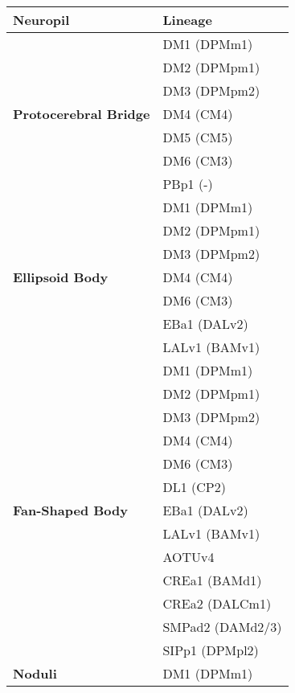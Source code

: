         \begin{table}[ht]
        \centering
        \begin{tabular}{l|l}
            \toprule
            \textbf{Neuropil} & \textbf{Lineage} \\
            \midrule
            \multirow{7}{*}{\textbf{Protocerebral Bridge}} 
                & DM1 (DPMm1) \\
                & DM2 (DPMpm1) \\
                & DM3 (DPMpm2) \\
                & DM4 (CM4) \\
                & DM5 (CM5) \\
                & DM6 (CM3) \\
                & PBp1 (-) \\
            \midrule
            \multirow{7}{*}{\textbf{Ellipsoid Body}} 
                & DM1 (DPMm1) \\
                & DM2 (DPMpm1) \\
                & DM3 (DPMpm2) \\
                & DM4 (CM4) \\
                & DM6 (CM3) \\
                & EBa1 (DALv2) \\
                & LALv1 (BAMv1) \\
            \midrule
            \multirow{13}{*}{\textbf{Fan-Shaped Body}} 
                & DM1 (DPMm1) \\
                & DM2 (DPMpm1) \\
                & DM3 (DPMpm2) \\
                & DM4 (CM4) \\
                & DM6 (CM3) \\
                & DL1 (CP2) \\
                & EBa1 (DALv2) \\
                & LALv1 (BAMv1) \\
                & AOTUv4 \\
                & CREa1 (BAMd1) \\
                & CREa2 (DALCm1) \\
                & SMPad2 (DAMd2/3) \\
                & SIPp1 (DPMpl2) \\
            \midrule
            \multirow{7}{*}{\textbf{Noduli}} 
                & DM1 (DPMm1) \\

\end{tabular}
\end{table}
